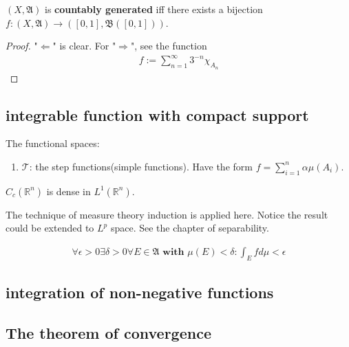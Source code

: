 \begin{theorem}
	$(X, \mathfrak{A})$ is \textbf{countably generated} iff there exists a bijection $f: (X, \mathfrak{A}) \rightarrow ([0, 1], \mathfrak{B}([0, 1]))$.
\end{theorem}
\begin{proof}
	"$\Leftarrow$" is clear. For "$\Rightarrow$", see the function 
	\begin{align*}
		f:= \sum_{n = 1}^\infty 3^{-n} \chi_{A_n}
	\end{align*}
\end{proof}


\subsection{integrable function with compact support}
The functional spaces:
\begin{enumerate}
	\item $\mathcal{T}$: the step functions(simple functions). Have the form $f = \sum_{i = 1}^n \alpha \mu(A_i)$. 
\end{enumerate}
\begin{lemma}
	
\end{lemma}

\begin{theorem}
	$C_c(\mathbb{R}^n)$ is dense in $L^1(\mathbb{R}^n)$.
\end{theorem}
\begin{remark}
The technique of measure theory induction is applied here. Notice the result could be extended to $L^p$ space. See the chapter of separability.	
\end{remark}

\begin{corollary}
	\begin{align*}
		\forall \epsilon > 0 \exists \delta > 0 \forall E \in \mathfrak{A} \textbf{ with } \mu(E) < \delta:
		\int_E f d\mu < \epsilon
	\end{align*}
\end{corollary}


\subsection{integration of non-negative functions}

\subsection{The theorem of convergence}



